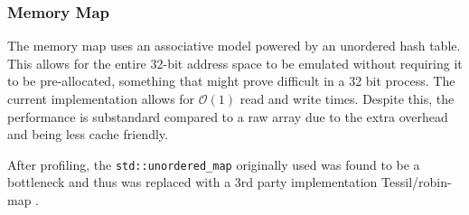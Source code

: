 \subsubsection{Memory Map}
\label{section:interpreter-mem-map}

The memory map uses an associative model powered by an unordered hash table. This allows for the entire 32-bit address space to be emulated without requiring it to be pre-allocated, something that might prove difficult in a 32 bit process. The current implementation allows for $\mathcal{O}(1)$ read and write times. Despite this, the performance is substandard compared to a raw array due to the extra overhead and being less cache friendly.

After profiling, the \texttt{std::unordered\_map} originally used was found to be a bottleneck and thus was replaced with a 3rd party implementation Tessil/robin-map \cite{tessil-map, tessil-benchmark}.